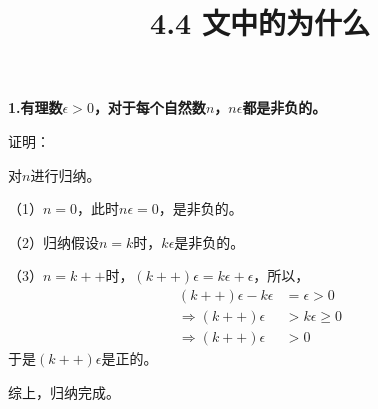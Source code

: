 \documentclass{article}
\theoremstyle{mystyle}
\begin{document}
\title{4.4 文中的为什么}
\maketitle

\textbf{1.有理数$\epsilon > 0$，对于每个自然数$n$，$n\epsilon$都是非负的。}

证明：

对$n$进行归纳。

（1）$n=0$，此时$n\epsilon = 0$，是非负的。

（2）归纳假设$n=k$时，$k\epsilon$是非负的。

（3）$n=k++$时，$(k++)\epsilon=k\epsilon + \epsilon$，所以，
\begin{align*}
  (k++)\epsilon - k\epsilon & = \epsilon > 0     \\
  \Rightarrow (k++)\epsilon & > k\epsilon \geq 0 \\
  \Rightarrow (k++)\epsilon & > 0
\end{align*}
于是$(k++)\epsilon$是正的。

综上，归纳完成。
\end{document}
